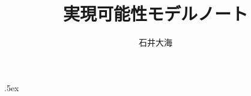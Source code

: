 \theoremstyle{nonumberplain}
\theoremprework{\begin{mystdthmbox}{}}
\theorempostwork{\end{mystdthmbox}}
\newtheorem{rem*}{注意}
\theoremprework{\begin{mystdthmbox}{}}
\theorempostwork{\end{mystdthmbox}}
\newtheorem{notation}{記号}
\theoremstyle{nonumberplain}
\theoremheaderfont{\itshape}
\theoremindent .5ex
\theorembodyfont{\upshape}
\theoremsymbol{\ensuremath{\Box}}
\theoremprework{\begin{mythmleftbar}}
\theorempostwork{\end{mythmleftbar}}
\theoremseparator{}
\newtheorem{subproof}{Proof}

\qedsymbol{\ensuremath{\Box}}
\normalem


\makeatletter
\def\KVM#1{\KVM@init#1{\relax}}
\def\KVM@init#1#2{#1 \cons \KVM@rest#2}
\def\KVM@rest#1#2{%
\def\KVM@next{\KVM@rest{#1 \push #2}}
\ifx#2\relax
#1
\else
\expandafter\KVM@next
\fi
}
\makeatother

\title{実現可能性モデルノート}
\author{石井大海}

\usepackage{amssymb}	%
\usepackage{amsmath}	%
\usepackage[normalem]{ulem}	%


